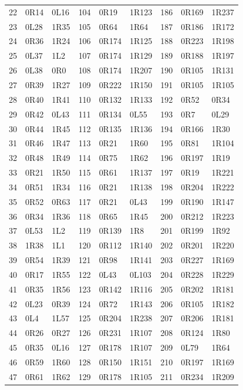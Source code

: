 \begin{longtable}{@{}rll@{\hspace{8mm}}rll@{\hspace{8mm}}rll@{}}
22 & 0R14 & 0L16 & 104 & 0R19 & 1R123 & 186 & 0R169 & 1R237\\
23 & 0L28 & 1R35 & 105 & 0R64 & 1R64 & 187 & 0R186 & 1R172\\
24 & 0R36 & 1R24 & 106 & 0R174 & 1R125 & 188 & 0R223 & 1R198\\
25 & 0L37 & 1L2 & 107 & 0R174 & 1R129 & 189 & 0R188 & 1R197\\
26 & 0L38 & 0R0 & 108 & 0R174 & 1R207 & 190 & 0R105 & 1R131\\
27 & 0R39 & 1R27 & 109 & 0R222 & 1R150 & 191 & 0R105 & 1R105\\
28 & 0R40 & 1R41 & 110 & 0R132 & 1R133 & 192 & 0R52 & 0R34\\
29 & 0R42 & 0L43 & 111 & 0R134 & 0L55 & 193 & 0R7 & 0L29\\
30 & 0R44 & 1R45 & 112 & 0R135 & 1R136 & 194 & 0R166 & 1R30\\
31 & 0R46 & 1R47 & 113 & 0R21 & 1R60 & 195 & 0R81 & 1R104\\
32 & 0R48 & 1R49 & 114 & 0R75 & 1R62 & 196 & 0R197 & 1R19\\
33 & 0R21 & 1R50 & 115 & 0R61 & 1R137 & 197 & 0R19 & 1R221\\
34 & 0R51 & 1R34 & 116 & 0R21 & 1R138 & 198 & 0R204 & 1R222\\
35 & 0R52 & 0R63 & 117 & 0R21 & 0L43 & 199 & 0R190 & 1R147\\
36 & 0R34 & 1R36 & 118 & 0R65 & 1R45 & 200 & 0R212 & 1R223\\
37 & 0L53 & 1L2 & 119 & 0R139 & 1R8 & 201 & 0R199 & 1R92\\
38 & 1R38 & 1L1 & 120 & 0R112 & 1R140 & 202 & 0R201 & 1R220\\
39 & 0R54 & 1R39 & 121 & 0R98 & 1R141 & 203 & 0R227 & 1R169\\
40 & 0R17 & 1R55 & 122 & 0L43 & 0L103 & 204 & 0R228 & 1R229\\
41 & 0R35 & 1R56 & 123 & 0R142 & 1R116 & 205 & 0R202 & 1R181\\
42 & 0L23 & 0R39 & 124 & 0R72 & 1R143 & 206 & 0R105 & 1R182\\
43 & 0L4 & 1L57 & 125 & 0R204 & 1R238 & 207 & 0R206 & 1R181\\
44 & 0R26 & 0R27 & 126 & 0R231 & 1R107 & 208 & 0R124 & 1R80\\
45 & 0R35 & 0L16 & 127 & 0R178 & 1R107 & 209 & 0L79 & 1R64\\
46 & 0R59 & 1R60 & 128 & 0R150 & 1R151 & 210 & 0R197 & 1R169\\
47 & 0R61 & 1R62 & 129 & 0R178 & 1R105 & 211 & 0R234 & 1R209\\

\end{longtable}
